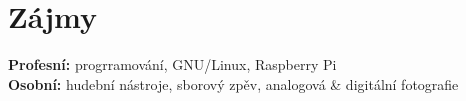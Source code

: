\documentclass[]{friggeri-cv} %
\begin{document}

\section{Zájmy}

\textbf{Profesní:} progrramování, GNU/Linux, Raspberry Pi
\\
\textbf{Osobní:} hudební nástroje, sborový zpěv, analogová \& digitální fotografie

\end{document}
